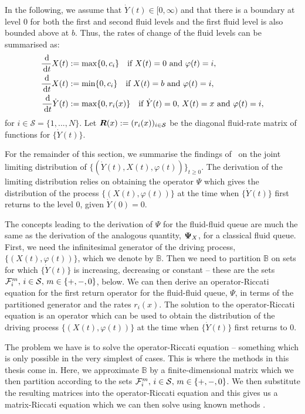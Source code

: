 In the following, we assume that $\dot Y(t) \in [0,\infty)$ and that there is a boundary at level $0$ for both the first and second fluid levels and the first fluid level is also bounded above at \(b\). Thus, the rates of change of the fluid levels can be summarised as:
% 
	\begin{align*} 
		\frac{\, \mathrm{d}}{\, \mathrm{d} t}  X(t) & := \max\{0, c_i\} \quad \mbox{if }  X(t) = 0 \mbox{ and } \varphi(t) = i, \\
		\frac{\, \mathrm{d}}{\, \mathrm{d} t}  X(t) & := \min\{0, c_i\} \quad \mbox{if }  X(t) = b \mbox{ and } \varphi(t) = i, \\
          	\frac{\, \mathrm{d}}{\, \mathrm{d} t} \dot Y(t) & := \max\{0, r_i(x)\} \quad \mbox{if } \dot Y(t) = 0,\, X(t) = x \mbox{ and } \varphi(t) = i, 	
	\end{align*} 
for $i \in \mathcal{S} = \{1,...,N\}$. Let $\boldsymbol R(x) := (r_i(x))_{i \in \mathcal{S}}$ be the diagonal fluid-rate matrix of functions for $\{\dot Y(t)\}$. 

For the remainder of this section, we summarise the findings of~\cite{bo2014} on the joint limiting distribution of $\{( \dot Y(t), X(t), \varphi(t))\}_{t \geq 0}$. The derivation of the limiting distribution relies on obtaining the operator \(\mathbb \Psi\) which gives the distribution of the process \(\{(X(t),\varphi(t))\}\) at the time when \(\{\dot Y(t)\}\) first returns to the level 0, given \(\dot Y(0)=0\).

The concepts leading to the derivation of \( {\mathbb \Psi}\) for the fluid-fluid queue are much the same as the derivation of the analogous quantity, \(\boldsymbol\Psi_X\), for a classical fluid queue. First, we need the infinitesimal generator of the driving process, \(\{(X(t),\varphi(t))\}\), which we denote by \(\mathbb B\). Then we need to partition \(\mathbb B\) on sets for which \(\{\dot Y(t)\}\) is increasing, decreasing or constant -- these are the sets \(\mathcal F_i^m,\, i\in\mathcal{S},\,m\in\{+,-,0\}\), below. We can then derive an operator-Riccati equation for the first return operator for the fluid-fluid queue, \(\mathbb \Psi\), in terms of the partitioned generator and the rates \(r_i(x)\). The solution to the operator-Riccati equation is an operator which can be used to obtain the distribution of the driving process \(\{(X(t),\varphi(t))\}\) at the time when \(\{\dot Y(t)\}\) first returns to \(0\). 

The problem we have is to solve the operator-Riccati equation -- something which is only possible in the very simplest of cases. This is where the methods in this thesis come in. Here, we approximate \(\mathbb B\) by a finite-dimensional matrix which we then partition according to the sets \(\mathcal F_i^m,\, i\in\mathcal{S},\,m\in\{+,-,0\}\). We then substitute the resulting matrices into the operator-Riccati equation and this gives us a matrix-Riccati equation which we can then solve using known methods \citep{bot08}. 

